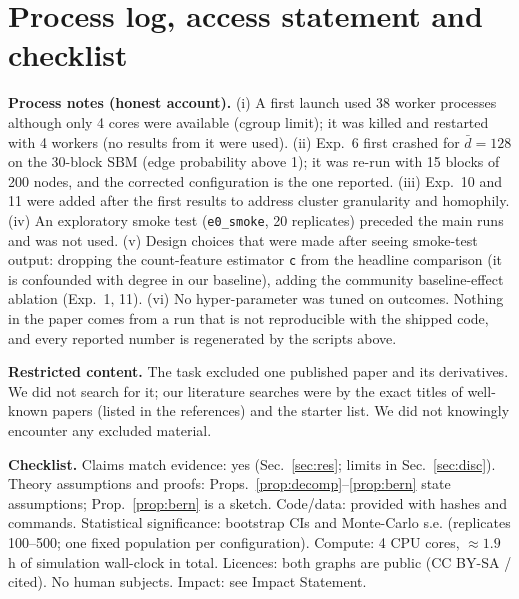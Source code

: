 \begin{table}[t]
\caption{Community-level baseline effect sd $s_b\in\{0,0.5,1,2\}$ (Exp.~11, \texttt{sat}): RMSE (GATE $=2$), 300 replicates.}\label{tab:e11}
\centering\scriptsize

\end{table}

\begin{table}[t]
\caption{Full coverage table (Exp.~7; columns as in Table~\ref{tab:e7}).}\label{tab:e7full}
\centering\scriptsize

\end{table}

\section{Process log, access statement and checklist}
\textbf{Process notes (honest account).} (i) A first launch used 38 worker processes although only 4 cores were available (cgroup limit); it was killed and restarted with 4 workers (no results from it were used). (ii) Exp.~6 first crashed for $\bar d{=}128$ on the 30-block SBM (edge probability above 1); it was re-run with 15 blocks of 200 nodes, and the corrected configuration is the one reported. (iii) Exp.~10 and 11 were added after the first results to address cluster granularity and homophily. (iv) An exploratory smoke test (\texttt{e0\_smoke}, 20 replicates) preceded the main runs and was not used. (v) Design choices that were made after seeing smoke-test output: dropping the count-feature estimator \texttt{c} from the headline comparison (it is confounded with degree in our baseline), adding the community baseline-effect ablation (Exp.~1, 11). (vi) No hyper-parameter was tuned on outcomes. Nothing in the paper comes from a run that is not reproducible with the shipped code, and every reported number is regenerated by the scripts above.

\textbf{Restricted content.} The task excluded one published paper and its derivatives. We did not search for it; our literature searches were by the exact titles of well-known papers (listed in the references) and the starter list. We did not knowingly encounter any excluded material.

\textbf{Checklist.} Claims match evidence: yes (Sec.~\ref{sec:res}; limits in Sec.~\ref{sec:disc}). Theory assumptions and proofs: Props.~\ref{prop:decomp}--\ref{prop:bern} state assumptions; Prop.~\ref{prop:bern} is a sketch. Code/data: provided with hashes and commands. Statistical significance: bootstrap CIs and Monte-Carlo s.e. (replicates 100--500; one fixed population per configuration). Compute: 4 CPU cores, $\approx1.9$ h of simulation wall-clock in total. Licences: both graphs are public (CC BY-SA / cited). No human subjects. Impact: see Impact Statement.
